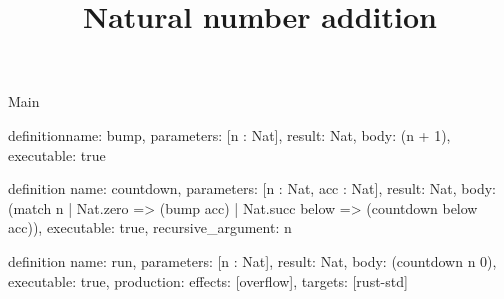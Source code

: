 \begin{lexlean}{Main}
\title{Natural number addition}
\begin{semanticmodule}
definition{name: bump, parameters: [n : Nat], result: Nat, body: (n + 1), executable: true}

definition{
  name: countdown,
  parameters: [n : Nat, acc : Nat],
  result: Nat,
  body: (match n | Nat.zero => (bump acc) | Nat.succ below => (countdown below acc)),
  executable: true,
  recursive_argument: n
}

definition{
  name: run,
  parameters: [n : Nat],
  result: Nat,
  body: (countdown n 0),
  executable: true,
  production: {effects: [overflow], targets: [rust-std]}
}
\end{semanticmodule}
\end{lexlean}
